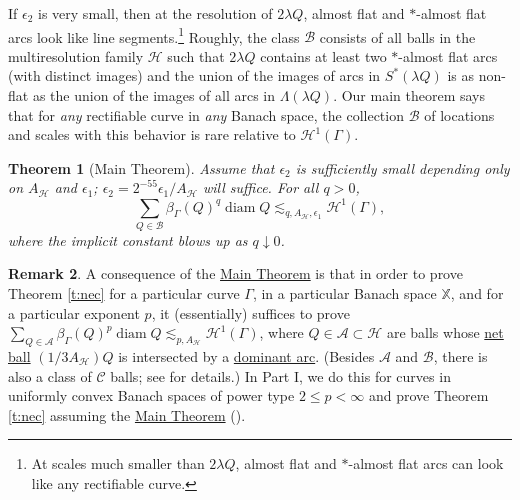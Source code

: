 \documentclass[12pt]{amsart}
\numberwithin{equation}{section}
\theoremstyle{plain}
\newtheorem{theorem}{Theorem}[section]
\theoremstyle{definition}
\newtheorem{remark}[theorem]{Remark}
\def\XX{{\mathbb{X}}}
\newcommand{\diam}{\mathop\mathrm{diam}\nolimits}
\newcommand{\Haus}{\mathcal{H}}
\numberwithin{figure}{section}
\begin{document}
If $\epsilon_2$ is very small, then at the resolution of $2\lambda Q$, almost flat and $*$-almost flat arcs look like line segments.\footnote{At scales much smaller than $2\lambda Q$, almost flat and $*$-almost flat arcs can look like any rectifiable curve.} Roughly, the class $\mathscr{B}$ consists of all balls in the multiresolution family $\mathscr{H}$ such that $2\lambda Q$ contains at least two $*$-almost flat arcs (with distinct images) and the union of the images of arcs in $S^*(\lambda Q)$ is as non-flat as the union of the images of all arcs in $\Lambda(\lambda Q)$. Our main theorem says that for \emph{any} rectifiable curve in \emph{any} Banach space, the collection $\mathscr{B}$ of locations and scales with this behavior is rare relative to $\Haus^1(\Gamma)$.

\begin{theorem}[Main Theorem] \label{t:main} Assume that $\epsilon_2$ is sufficiently small depending only on $A_\mathscr{H}$ and $\epsilon_1$; $\epsilon_2=2^{-55}\epsilon_1/A_\mathscr{H}$ will suffice. For all $q>0$, \begin{equation}\label{B-sum} \sum_{Q\in\mathscr{B}} \beta_\Gamma(Q)^q\diam Q\lesssim_{q,A_\mathscr{H},\epsilon_1}\Haus^1(\Gamma),\end{equation} where the implicit constant blows up as $q\downarrow 0$.\end{theorem}

\begin{remark} A consequence of the \hyperref[t:main]{Main Theorem} is that in order to prove Theorem \ref{t:nec} for a particular curve $\Gamma$, in a particular Banach space $\XX$, and for a particular exponent $p$, it (essentially) suffices to prove $\sum_{Q\in\mathscr{A}} \beta_\Gamma(Q)^p\diam Q\lesssim_{p,A_\mathscr{H}} \Haus^1(\Gamma)$, where $Q\in\mathscr{A}\subset\mathscr{H}$ are balls whose \hyperref[netball]{net ball} $(1/3A_\mathscr{H})Q$ is intersected by a \hyperref[dom-arcs]{dominant arc}. (Besides $\mathscr{A}$ and $\mathscr{B}$, there is also a class of $\mathscr{C}$ balls; see \cite[\S3.3]{Badger-McCurdy-1} for details.) In Part I, we do this for curves in uniformly convex Banach spaces of power type $2\leq p<\infty$ and prove Theorem \ref{t:nec} assuming the \hyperref[t:main]{Main Theorem} (\cite[Theorem 3.30]{Badger-McCurdy-1}). \end{remark}
\end{document}
